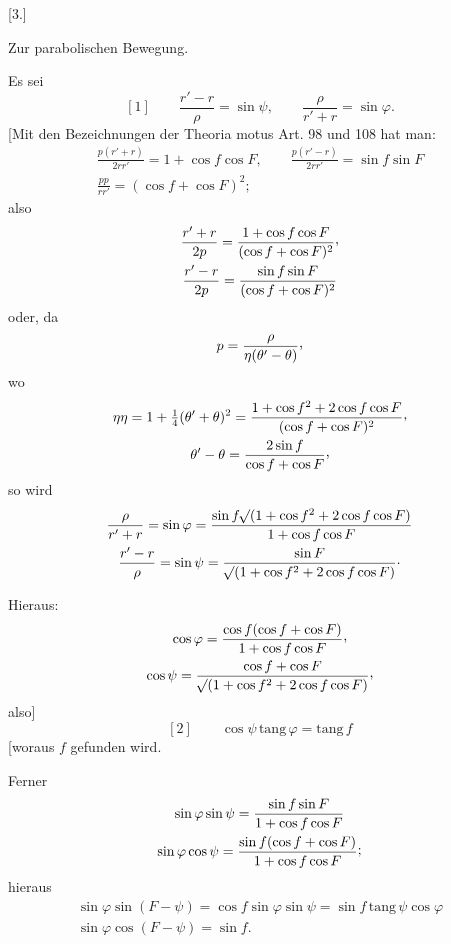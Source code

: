 \clearpage
{}
\begin{center}
[3.]\par
\medskip
Zur parabolischen Bewegung.\par
{}
\end{center}

Es sei
\[
\mathrm{[1]}\qquad \frac{r'-r}{\rho}=\sin\psi,\qquad \frac{\rho}{r'+r}=\sin\varphi.
\]
[Mit den Bezeichnungen der Theoria motus Art. 98 und 108 hat man:
\[
\begin{gathered}
\frac{p(r'+r)}{2rr'}=1+\cos f\cos F,\qquad
\frac{p(r'-r)}{2rr'}=\sin f\sin F\\
\frac{pp}{rr'}=(\cos f+\cos F)^2;
\end{gathered}
\]
also
\[
\begin{gathered}
\frac{r'+r}{2p}=\frac{1+\cos f\cos F}{(\cos f+\cos F)^2}\mathpunct{\raisebox{.45ex}{,}}\\
\frac{r'-r}{2p}=\frac{\sin f\sin F}{(\cos f+\cos F)^2}
\end{gathered}
\]
oder, da
\[
p=\frac{\rho}{\eta(\theta'-\theta)}\mathpunct{\raisebox{.45ex}{,}}
\]
wo
\[
\begin{gathered}
\eta\eta=1+\tfrac14(\theta'+\theta)^2=\frac{1+\cos f^2+2\cos f\cos F}{(\cos f+\cos F)^2}\mathpunct{\raisebox{.45ex}{,}}\\
\theta'-\theta=\frac{2\sin f}{\cos f+\cos F}\mathpunct{\raisebox{.45ex}{,}}
\end{gathered}
\]
so wird
\[
\begin{gathered}
\frac{\rho}{r'+r}=\sin\varphi=\frac{\sin f\mathord{{}^{}\!\surd}(1+\cos f^2+2\cos f\cos F)}{1+\cos f\cos F}\\
\frac{r'-r}{\rho}=\sin\psi=\frac{\sin F}{\mathord{{}^{}\!\surd}(1+\cos f^2+2\cos f\cos F)}\mathpunct{\cdot}
\end{gathered}
\]

Hieraus:
\[
\begin{gathered}
\cos\varphi=\frac{\cos f(\cos f+\cos F)}{1+\cos f\cos F}\mathpunct{\raisebox{.45ex}{,}}\\
\cos\psi=\frac{\cos f+\cos F}{\BareRoot{(1+\cos f^2+2\cos f\cos F)}}\mathpunct{\raisebox{.45ex}{,}}
\end{gathered}
\]
also]
\[
\mathrm{[2]}\qquad \cos\psi\,\mathrm{tang}\,\varphi=\mathrm{tang}\,f
\]
[woraus \(f\) gefunden wird.

Ferner
\[
\begin{gathered}
\sin\varphi\sin\psi=\frac{\sin f\sin F}{1+\cos f\cos F}\\
\sin\varphi\cos\psi=\frac{\sin f(\cos f+\cos F)}{1+\cos f\cos F}\mathpunct{\raisebox{.25ex}{;}}
\end{gathered}
\]
hieraus
\[
\begin{gathered}
\sin\varphi\sin(F-\psi)=\cos f\sin\varphi\sin\psi=\sin f\,\mathrm{tang}\,\psi\cos\varphi\\
\sin\varphi\cos(F-\psi)=\sin f.
\end{gathered}
\]


